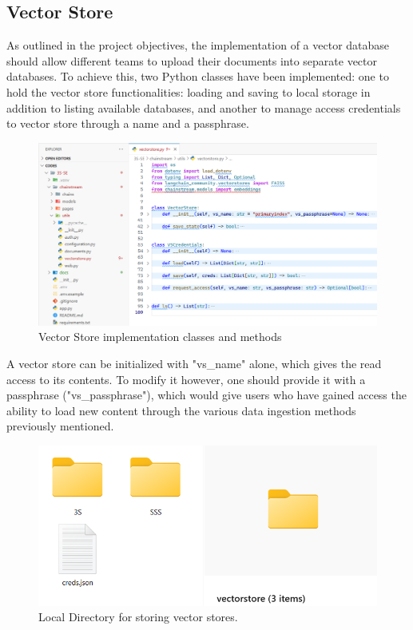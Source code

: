 \subsection{Vector Store}
As outlined in the project objectives, the implementation of a vector database should allow different teams to upload their documents into separate vector databases.\newline
To achieve this, two Python classes have been implemented: one to hold the vector store functionalities: loading and saving to local storage in addition to listing available databases, and another to manage access credentials to vector store through a name and a passphrase.\newpage
\begin{figure}[htbp]
    \centering
    \includegraphics[width=\linewidth]{./figures/vectorstore-implementation.png}
    \caption{Vector Store implementation classes and methods}
\end{figure}
A vector store can be initialized with "vs\_name" alone, which gives the read access to its contents. To modify it however, one should provide it with a passphrase ("vs\_passphrase"), which would give users who have gained access the ability to load new content through the various data ingestion methods previously mentioned.
\begin{figure}[htbp]
    \centering
    \includegraphics[width=.8\linewidth]{./figures/vectorstore-local-dir.png}
    \caption{Local Directory for storing vector stores.}
\end{figure}\newline
